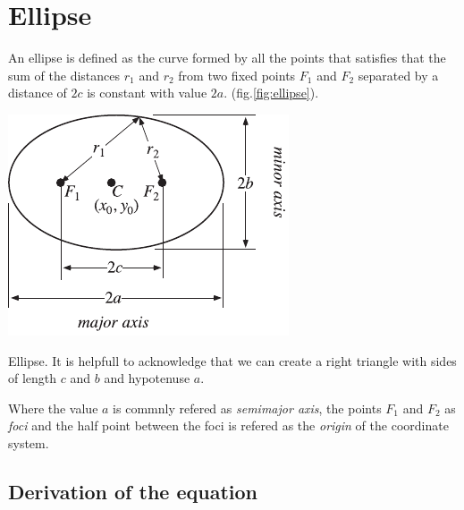 \documentclass[../main-notes.tex]{subfiles}
\begin{document}
\section{Ellipse}

An ellipse is defined as the curve formed by all the points that satisfies that the sum of the distances $r_1$ and $r_2$ from two fixed points $F_1$ and $F_2$ separated by a distance of $2c$ is constant with value $2a$. (fig.\ref{fig:ellipse}).
\begin{marginfigure}
    \centering
    \includegraphics[width=\textwidth]{../Figures/ellipse/EllipseBipolar_700.pdf}
    \caption{Ellipse. It is helpfull to acknowledge that we can create a right triangle with sides of length $c$ and $b$ and hypotenuse $a$.}\label{fig:ellipse}
\end{marginfigure}
Where the value $a$ is commnly refered as \textit{semimajor axis}, the points $F_1$ and $F_2$ as \textit{foci} and the half point between the foci is refered as the \textit{origin} of the coordinate system.

\subsection{Derivation of the equation}
\end{document}
